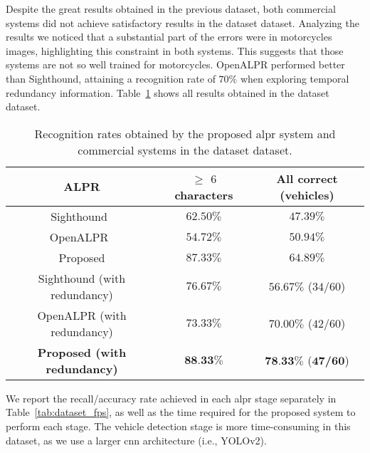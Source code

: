Despite the great results obtained in the previous dataset, both commercial systems did not achieve satisfactory results in the \acrshort*{dataset} dataset. 
Analyzing the results we noticed that a substantial part of the errors were in motorcycles images, highlighting this constraint in both systems.
This suggests that those systems are not so well trained for motorcycles.
OpenALPR performed better than Sighthound, attaining a recognition rate of $70\%$ when exploring temporal redundancy information. Table~\ref{tab:dataset_results} shows all results obtained in the \gls*{dataset} dataset.

\begin{table}[!htb]
	\centering
	\caption{Recognition rates obtained by the proposed \gls*{alpr} system and commercial systems in the \acrshort*{dataset} dataset.}
	\label{tab:dataset_results}
	{
		\renewcommand{\arraystretch}{1.1}
		\begin{tabular}{@{}ccc@{}}
			\toprule
			ALPR & $\geq$ $6$ characters & All correct (vehicles)\\ \midrule
			Sighthound~\cite{masood2017sighthound} & $62.50\%$ & $47.39\%$ \\ 
			OpenALPR~\cite{openalpr} & $54.72\%$ & $50.94\%$ \\
			Proposed & $87.33\%$ & $64.89\%$ \\ \midrule
			Sighthound (with redundancy) & $76.67\%$ & $56.67\%$ ($34$/$60$) \\
			OpenALPR (with redundancy) & $73.33\%$ & $70.00\%$ ($42$/$60$)\\ 
			\textbf{Proposed (with redundancy)} & $\textbf{88.33\%}$ & $\textbf{78.33\%}$ ($\textbf{47}$\textbf{/}$\textbf{60}$) \\ \bottomrule
		\end{tabular}
	}
\end{table}

We report the recall/accuracy rate achieved in each \gls*{alpr} stage separately in Table~\ref{tab:dataset_fps}, as well as the time required for the proposed system to perform each stage. The vehicle detection stage is more time-consuming in this dataset, as we use a larger \gls*{cnn} architecture (i.e., YOLOv2).

